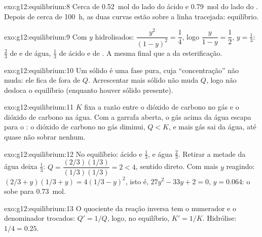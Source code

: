 \begin{solution}{exo:g12:equilibrium:8}
Cerca de \qty{0.52}{mol} do lado do ácido e \qty{0.79}{mol} do lado do
. Depois de cerca de \qty{100}{h}, as duas curvas estão sobre a
linha tracejada: equilíbrio.
\end{solution}

\begin{solution}{exo:g12:equilibrium:9}
Com $y$  hidrolisados: $\dfrac{y^2}{(1-y)^2} = \dfrac{1}{4}$, logo
$\dfrac{y}{1-y} = \dfrac{1}{2}$, $y = \frac{1}{3}$: $\frac{2}{3}$  de
 e de água, $\frac{1}{3}$  de ácido e de . A mesma 
final que a da esterificação.
\end{solution}

\begin{solution}{exo:g12:equilibrium:10}
Um sólido é uma fase pura, cuja ``concentração'' não muda: ele fica de
fora de $Q$. Acrescentar mais sólido não muda $Q$, logo não desloca o
equilíbrio (enquanto houver sólido presente).
\end{solution}

\begin{solution}{exo:g12:equilibrium:11}
$K$ fixa a razão entre o dióxido de carbono no gás e o dióxido de
carbono na água. Com a garrafa aberta, o gás acima da água escapa para o
: o dióxido de carbono no gás diminui, $Q < K$, e mais gás sai da
água, até quase não sobrar nenhum.
\end{solution}

\begin{solution}{exo:g12:equilibrium:12}
No equilíbrio: ácido e  $\frac{1}{3}$,  e água
$\frac{2}{3}$. Retirar a metade da água deixa $\frac{1}{3}$:
$Q = \dfrac{(2/3)(1/3)}{(1/3)(1/3)} = 2 < 4$, sentido direto. Com mais $y$
reagindo: $(2/3 + y)(1/3 + y) = 4(1/3 - y)^2$, isto é,
$27y^2 - 33y + 2 = 0$, $y = 0.064$: o  sobe para \qty{0.73}{mol}.
\end{solution}

\begin{solution}{exo:g12:equilibrium:13}
O quociente da reação inversa tem o numerador e o denominador trocados:
$Q' = 1/Q$, logo, no equilíbrio, $K' = 1/K$. Hidrólise:
$1/4 = 0.25$.
\end{solution}

